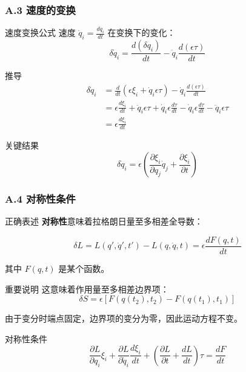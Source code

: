 \documentclass[xcolor=dvipsnames]{ctexbeamer}
\begin{document}
\begin{frame}
\frametitle{A.3 速度的变换}
\begin{block}{速度变换公式}
速度 $\dot{q}_i = \frac{dq_i}{dt}$ 在变换下的变化：
$$\delta \dot{q}_i = \frac{d(\delta q_i)}{dt} - \dot{q}_i \frac{d(\epsilon \tau)}{dt}$$
\end{block}

\pause

\begin{block}{推导}
\begin{align*}
\delta \dot{q}_i &= \frac{d}{dt}(\epsilon \xi_i + \dot{q}_i \epsilon \tau) - \dot{q}_i \frac{d(\epsilon \tau)}{dt} \\
&= \epsilon \frac{d\xi_i}{dt} + \ddot{q}_i \epsilon \tau + \dot{q}_i \epsilon \frac{d\tau}{dt} - \dot{q}_i \epsilon \frac{d\tau}{dt} - \ddot{q}_i \epsilon \tau \\
&= \epsilon \frac{d\xi_i}{dt}
\end{align*}
\end{block}

\pause

\begin{alertblock}{关键结果}
$$\delta \dot{q}_i = \epsilon \left(\frac{\partial \xi_i}{\partial q_j}\dot{q}_j + \frac{\partial \xi_i}{\partial t}\right)$$
\end{alertblock}
\end{frame}

\begin{frame}
\frametitle{A.4 对称性条件}
\begin{block}{正确表述}
\textbf{对称性}意味着拉格朗日量至多相差全导数：

$$\delta L = L(q', \dot{q}', t') - L(q, \dot{q}, t) = \epsilon \frac{dF(q, t)}{dt}$$

其中 $F(q, t)$ 是某个函数。
\end{block}

\pause

\begin{alertblock}{重要说明}
这意味着作用量至多相差边界项：
$$\delta S = \epsilon[F(q(t_2), t_2) - F(q(t_1), t_1)]$$

由于变分时端点固定，边界项的变分为零，因此运动方程不变。
\end{alertblock}

\pause

\begin{block}{对称性条件}
$$\frac{\partial L}{\partial q_i}\xi_i + \frac{\partial L}{\partial \dot{q}_i}\frac{d\xi_i}{dt} + \left(\frac{\partial L}{\partial t} + \frac{dL}{dt}\right)\tau = \frac{dF}{dt}$$
\end{block}
\end{frame}
\end{document}
